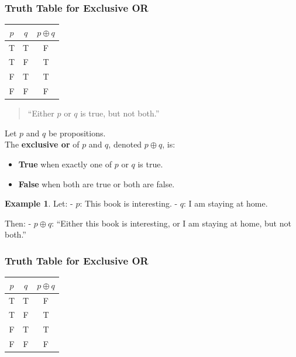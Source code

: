 \documentclass[
]{book}
\providecommand{\tightlist}{%
  \setlength{\itemsep}{0pt}\setlength{\parskip}{0pt}}
\theoremstyle{definition}
\theoremstyle{definition}
\newtheorem{example}{Example}[chapter]
\theoremstyle{definition}
\theoremstyle{definition}
\theoremstyle{remark}
\begin{document}
\subsubsection{Truth Table for Exclusive OR}\label{truth-table-for-exclusive-or}

\begin{longtable}[]{@{}ccc@{}}
\toprule\noalign{}
\(p\) & \(q\) & \(p \oplus q\) \\
\midrule\noalign{}
\endhead
\bottomrule\noalign{}
\endlastfoot
T & T & F \\
T & F & T \\
F & T & T \\
F & F & F \\
\end{longtable}

\begin{quote}
``Either \(p\) or \(q\) is true, but not both.''
\end{quote}

Let \(p\) and \(q\) be propositions.\\
The \textbf{exclusive or} of \(p\) and \(q\), denoted \(p \oplus q\), is:

\begin{itemize}
\tightlist
\item
  \textbf{True} when exactly one of \(p\) or \(q\) is true.
\item
  \textbf{False} when both are true or both are false.
\end{itemize}

\begin{example}
\protect\hypertarget{exm:unnamed-chunk-19}{}\label{exm:unnamed-chunk-19}Let:
- \(p\): This book is interesting.
- \(q\): I am staying at home.

Then:
- \(p \oplus q\): ``Either this book is interesting, or I am staying at home, but not both.''
\end{example}

\subsubsection{Truth Table for Exclusive OR}\label{truth-table-for-exclusive-or-1}

\begin{longtable}[]{@{}ccc@{}}
\toprule\noalign{}
\(p\) & \(q\) & \(p \oplus q\) \\
\midrule\noalign{}
\endhead
\bottomrule\noalign{}
\endlastfoot
T & T & F \\
T & F & T \\
F & T & T \\
F & F & F \\
\end{longtable}
\end{document}
